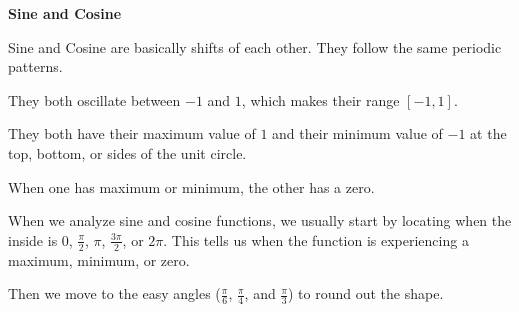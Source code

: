 \documentclass{ximera}
\begin{document}
\begin{example}
\begin{image}
\end{image}










\end{example}






\begin{summary} \textbf{\textcolor{red!70!yellow}{Sine and Cosine}}  


Sine and Cosine are basically shifts of each other.  They follow the same periodic patterns. 

They both oscillate between $-1$ and $1$, which makes their range $[-1,1]$. 

They both have their maximum value of $1$ and their minimum value of $-1$ at the top, bottom, or sides of the unit circle. 

When one has maximum or minimum, the other has a zero. 

\end{summary}


When we analyze sine and cosine functions, we usually start by locating when the inside is $0$, $\frac{\pi}{2}$, $\pi$, $\frac{3\pi}{2}$, or $2\pi$.  This tells us when the function is experiencing a maximum, minimum, or zero.

Then we move to the easy angles ($\frac{\pi}{6}$, $\frac{\pi}{4}$, and $\frac{\pi}{3}$) to round out the shape. 
\end{document}
